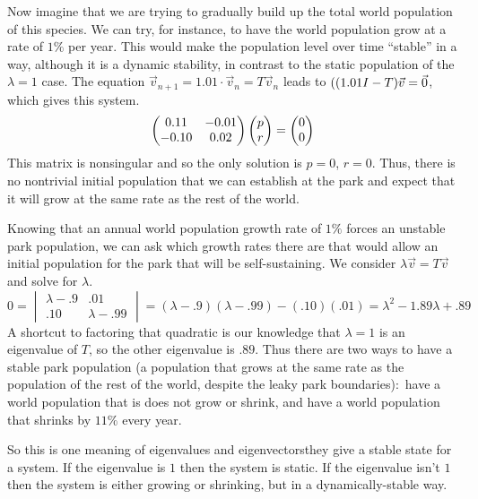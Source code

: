 Now imagine that we are trying to gradually build 
up the total world population of this species.
We can try, for instance, to have the world population grow at a rate
of $1\%$ per year.
This would make the population level over time ``stable'' in a way,
although it is a dynamic stability, in contrast to the static 
population of the $\lambda=1$ case.
The equation $\vec{v}_{n+1}=1.01\cdot\vec{v}_n=T\vec{v}_{n}$ leads to 
$((1.01 I-T)\vec{v}=\vec{0}$, which gives this system. 
\begin{equation*}
  \begin{pmatrix}
     0.11   &-0.01  \\
     -0.10  &0.02
  \end{pmatrix}
  \begin{pmatrix} p \\ r \end{pmatrix}=
  \begin{pmatrix} 0 \\ 0 \end{pmatrix}
\end{equation*}
This matrix is nonsingular and so the only solution is $p=0$,
$r=0$.
Thus, there is no nontrivial initial population that 
we can establish at the park 
and expect that it will grow at the same rate as the rest of the world.

Knowing that an annual world population growth rate of $1\%$ forces an
unstable park population,
we can ask which growth rates there are that would 
allow an initial population for
the park that will be self-sustaining.
We consider $\lambda\vec{v}=T\vec{v}$ and solve for $\lambda$.
\begin{equation*}
  0=\begin{vmatrix}
    \lambda-.9  &.01  \\
    .10         &\lambda-.99
  \end{vmatrix}
  =(\lambda-.9)(\lambda-.99)-(.10)(.01)
  =\lambda^2-1.89\lambda+.89
\end{equation*}
A shortcut to factoring that quadratic is our knowledge that $\lambda=1$
is an eigenvalue of $T$, so the other eigenvalue is $.89$.
Thus there are two ways to have a stable park population (a population that
grows at the same rate as the population of the rest of the world, despite
the leaky park boundaries):~have a world population that is does not 
grow or shrink, and have a world population that shrinks by $11\%$ every year.
 
So this is one meaning of eigenvalues and eigenvectors\Dash they give a 
stable state for a system.
If the eigenvalue is $1$ then the system is static.
If the eigenvalue isn't $1$ then the system is either growing or
shrinking, but in a dynamically-stable way.





